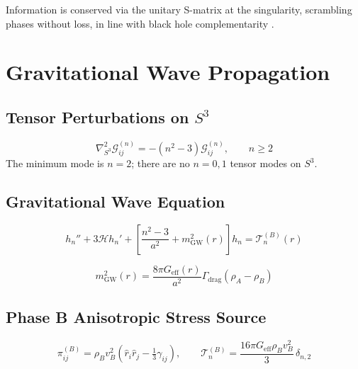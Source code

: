 \documentclass[10pt,twocolumn]{article}
\theoremstyle{definition}
\newcommand{\rhoA}{\rho_{A}}
\newcommand{\rhoB}{\rho_{B}}
\newcommand{\Hcal}{\mathcal{H}}
\newcommand{\Geff}{G_{\mathrm{eff}}}
\newcommand{\Gammadrag}{\Gamma_{\mathrm{drag}}}
\begin{document}
Information is conserved via the unitary S-matrix at the singularity, scrambling phases without loss, in line with black hole complementarity \citep{Susskind1993}.

\section{Gravitational Wave Propagation}
\label{sec:gw}

\subsection{Tensor Perturbations on \( S^{3} \)}

\begin{equation}
  \nabla^{2}_{S^{3}}\mathcal{G}^{(n)}_{ij}
    = -(n^{2}-3)\mathcal{G}^{(n)}_{ij},
  \qquad n\geq2
\end{equation}
The minimum mode is \( n=2 \); there are no \( n=0,1 \) tensor
modes on \( S^{3} \).

\subsection{Gravitational Wave Equation}

\begin{equation}
  h_{n}''+3\Hcal h_{n}'+\left[
    \frac{n^{2}-3}{a^{2}}+m_{\mathrm{GW}}^{2}(r)
  \right]h_{n} = \mathcal{T}_{n}^{(B)}(r)
  \label{eq:GW-eq}
\end{equation}

\begin{equation}
  m_{\mathrm{GW}}^{2}(r)
    = \frac{8\pi\Geff(r)}{a^{2}}
      \Gammadrag(\rhoA-\rhoB)
  \label{eq:mGW}
\end{equation}%


\subsection{Phase B Anisotropic Stress Source}


\begin{equation}
  \pi^{(B)}_{ij}
    = \rhoB v_{B}^{2}
      \!\left(\hat{r}_{i}\hat{r}_{j}
             -\tfrac{1}{3}\gamma_{ij}\right),
    \qquad
    \mathcal{T}_{n}^{(B)}
    = \frac{16\pi\Geff\rhoB v_{B}^{2}}{3}\,\delta_{n,2}
  \label{eq:T-B-GW}
\end{equation}
\end{document}
